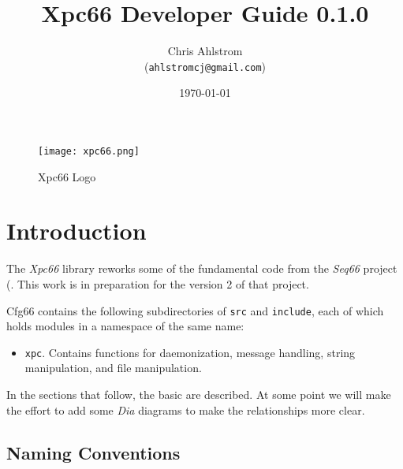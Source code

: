 \documentclass[
 11pt,
 twoside,
 a4paper,
 final                                 %
]{article}
\begin{document}
\title{Xpc66 Developer Guide 0.1.0}
\author{Chris Ahlstrom \\
   (\texttt{ahlstromcj@gmail.com})}
\date{\today}
\maketitle

\begin{figure}[H]
   \centering 
   \texttt{[image: xpc66.png]}
   \caption*{Xpc66 Logo}
\end{figure}

\clearpage                             %

\tableofcontents
\listoffigures                         %

%

\parindent 0pt
\parskip 9pt

\rhead{\rightmark}         %

\section{Introduction}
\label{sec:introduction}

   The \textsl{Xpc66} library reworks some of the fundamental code
   from the \textsl{Seq66} project (\cite{seq66}.
   This work is in preparation for the version 2 of that project.

   Cfg66 contains the following subdirectories of \texttt{src} and
   \texttt{include}, each of which holds modules in a
   namespace of the same name:

   \begin{itemize}
      \item \texttt{xpc}.
         Contains functions for daemonization, message handling,
         string manipulation, and file manipulation.
   \end{itemize}

   In the sections that follow, the basic are described.
   At some point we will make the effort to add some \textsl{Dia}
   diagrams to make the relationships more clear.

\subsection{Naming Conventions}
\label{subsec:introduction_conventions}
\end{document}

